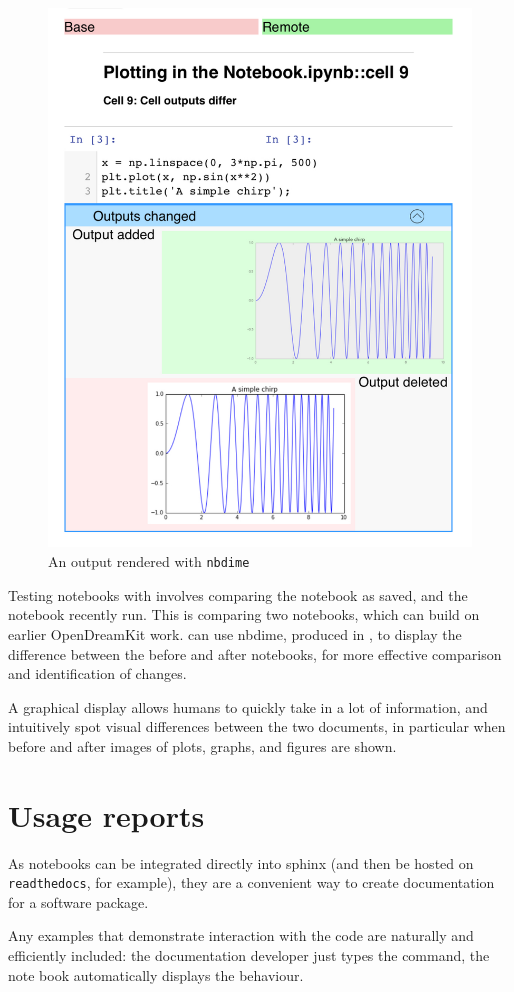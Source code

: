 \documentclass{deliverablereport}
\begin{document}
\begin{figure}[ht]
  \centering
  \includegraphics[width=.7\textwidth]{img/nbval-nbdime}
  \caption{An \nbval output rendered with \texttt{nbdime}}\label{fig:nbval-nbdime}
\end{figure}

Testing notebooks with \nbval involves comparing the notebook as saved,
and the notebook recently run.
This is comparing two notebooks,
which can build on earlier OpenDreamKit work.
\nbval can use nbdime, produced in ,
to display the difference between the before and after notebooks,
for more effective comparison and identification of changes.

A graphical display allows humans to quickly take in a lot of
information, and intuitively spot visual differences between the
two documents, in particular when before and after images of
plots, graphs, and figures are shown.

\section{Usage reports}

As notebooks can be integrated directly into sphinx (and then be
hosted on \texttt{readthedocs}, for example), they are a convenient
way to create documentation for a software package.

Any examples that demonstrate interaction with the code are naturally
and efficiently included: the documentation developer just types the
command, the note book automatically displays the behaviour.
\end{document}

